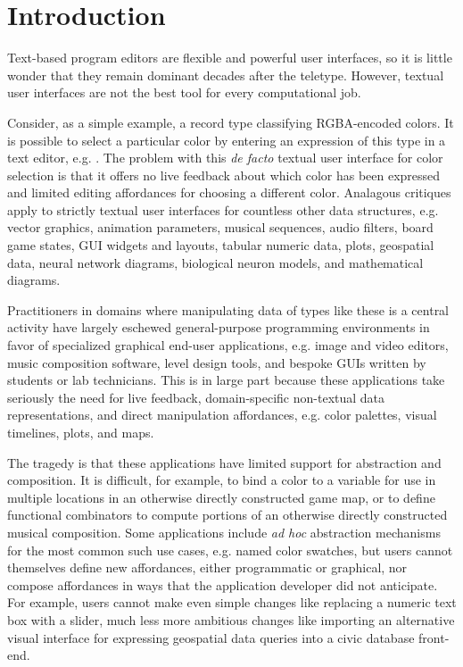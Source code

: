 \section{Introduction}\label{sec:intro}
Text-based program editors are flexible and powerful user interfaces,
so it is little wonder that they remain dominant decades after the teletype.
However, textual user interfaces are not the best tool for every computational job.

Consider, as a simple example, a record type
classifying RGBA-encoded colors.
It is possible to select a particular color by entering
an expression of this type in a text editor, e.g. .
The problem with this \emph{de facto} textual user interface for color selection is that
it offers no live feedback about which color has been expressed
and limited editing affordances for choosing a different color.
Analagous critiques apply to strictly textual user interfaces for
countless other data structures,
e.g. vector graphics,
animation parameters,
musical sequences,
audio filters,
board game states,
GUI widgets and layouts,
tabular numeric data,
plots,
geospatial data,
neural network diagrams,
biological neuron models,
and mathematical diagrams.

Practitioners in domains where manipulating data of types like these is
a central activity
have largely eschewed general-purpose programming environments
in favor of specialized graphical end-user applications, e.g. %
image and video editors, music composition software, level design tools,
and bespoke GUIs written by students or lab technicians.
This is in large part because these applications
take seriously the need for live feedback, domain-specific
non-textual data representations, and
direct manipulation affordances,
e.g. color palettes, visual timelines, plots, and maps.

The tragedy is that these applications have
limited support for abstraction and composition.
It is difficult, for example, to bind a
color to a variable for use in multiple locations in an
otherwise directly constructed game map,
or to define functional combinators to compute portions of an
otherwise directly constructed musical composition.
Some applications include \emph{ad hoc} abstraction mechanisms for
the most common such use cases, e.g. named color swatches,
but users cannot themselves define new affordances, either programmatic or graphical,
nor compose
affordances in ways that the application developer did not anticipate.
For example,
users cannot make even simple changes like replacing a
numeric text box with a slider,
much less more ambitious changes like importing an alternative
visual interface for expressing geospatial data queries
into a civic database front-end.

